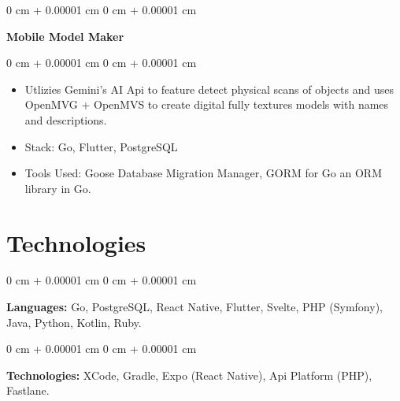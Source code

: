 \documentclass[10pt, letterpaper]{article}
\newenvironment{highlights}{
    \begin{itemize}[
        topsep=0.10 cm,
        parsep=0.10 cm,
        partopsep=0pt,
        itemsep=0pt,
        leftmargin=0 cm + 10pt
    ]
}{
    \end{itemize}
} %
\newenvironment{onecolentry}{
    \begin{adjustwidth}{
        0 cm + 0.00001 cm
    }{
        0 cm + 0.00001 cm
    }
}{
    \end{adjustwidth}
} %
\newenvironment{twocolentry}[2][]{
    \onecolentry
    \def\secondColumn{#2}
    \setcolumnwidth{\fill, 4.5 cm}
    \begin{paracol}{2}
}{
    \switchcolumn \raggedleft \secondColumn
    \end{paracol}
    \endonecolentry
} %
\begin{document}
        \vspace{0.2 cm}

        \begin{twocolentry}{}
            \textbf{Mobile Model Maker}\end{twocolentry}

        \vspace{0.10 cm}
        \begin{onecolentry}
            \begin{highlights}
                \item Utlizies Gemini's AI Api to feature detect physical scans of objects and uses OpenMVG + OpenMVS to create digital fully textures models with names and descriptions. 
                \item Stack: Go, Flutter, PostgreSQL
                \item Tools Used: Goose Database Migration Manager, GORM for Go an ORM library in Go.
            \end{highlights}
        \end{onecolentry}

        \vspace{0.2 cm}

    
    \section{Technologies}
        
        \begin{onecolentry}
            \textbf{Languages:} Go, PostgreSQL, React Native, Flutter, Svelte, PHP (Symfony), Java, Python, Kotlin, Ruby.
        \end{onecolentry}

        \vspace{0.2 cm}

        \begin{onecolentry}
            \textbf{Technologies:} XCode, Gradle, Expo (React Native), Api Platform (PHP), Fastlane.
        \end{onecolentry}
\end{document}
